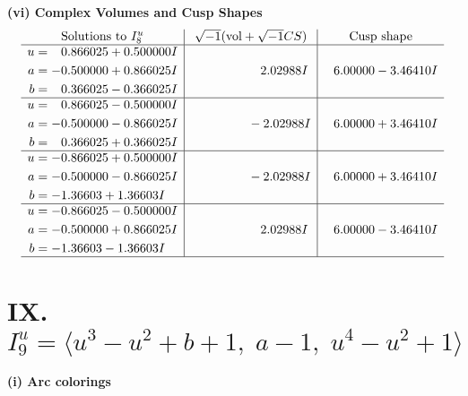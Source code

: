 \documentclass[1p]{elsarticle_modified}
\theoremstyle{definition}
\newcommand{\I}{\sqrt{-1}}
\begin{document}
\newpage\flushleft \textbf{(vi) Complex Volumes and Cusp Shapes}
$$\begin{array}{c|c|c}  
\text{Solutions to }I^u_{8}& \I (\text{vol} + \sqrt{-1}CS) & \text{Cusp shape}\\
 \hline 
\begin{aligned}
u &= \phantom{-}0.866025 + 0.500000 I \\
a &= -0.500000 + 0.866025 I \\
b &= \phantom{-}0.366025 - 0.366025 I\end{aligned}
 & \phantom{-0.000000 -}2.02988 I & \phantom{-}6.00000 - 3.46410 I \\ \hline\begin{aligned}
u &= \phantom{-}0.866025 - 0.500000 I \\
a &= -0.500000 - 0.866025 I \\
b &= \phantom{-}0.366025 + 0.366025 I\end{aligned}
 & \phantom{-0.000000 } -2.02988 I & \phantom{-}6.00000 + 3.46410 I \\ \hline\begin{aligned}
u &= -0.866025 + 0.500000 I \\
a &= -0.500000 - 0.866025 I \\
b &= -1.36603 + 1.36603 I\end{aligned}
 & \phantom{-0.000000 } -2.02988 I & \phantom{-}6.00000 + 3.46410 I \\ \hline\begin{aligned}
u &= -0.866025 - 0.500000 I \\
a &= -0.500000 + 0.866025 I \\
b &= -1.36603 - 1.36603 I\end{aligned}
 & \phantom{-0.000000 -}2.02988 I & \phantom{-}6.00000 - 3.46410 I\\
 \hline 
 \end{array}$$\newpage\newpage\renewcommand{\arraystretch}{1}
\centering \section*{IX. $I^u_{9}= \langle u^3- u^2+b+1,\;a-1,\;u^4- u^2+1 \rangle$}
\flushleft \textbf{(i) Arc colorings}\\
\end{document}
